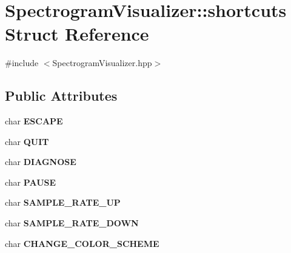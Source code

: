 \hypertarget{structSpectrogramVisualizer_1_1shortcuts}{}\section{Spectrogram\+Visualizer\+:\+:shortcuts Struct Reference}
\label{structSpectrogramVisualizer_1_1shortcuts}


{\ttfamily \#include $<$Spectrogram\+Visualizer.\+hpp$>$}

\subsection*{Public Attributes}
\begin{DoxyCompactItemize}
\item 
\mbox{\label{structSpectrogramVisualizer_1_1shortcuts_a3c916b79eb5fdbc9261962946104b26f}} 
char {\bfseries E\+S\+C\+A\+PE}
\item 
\mbox{\label{structSpectrogramVisualizer_1_1shortcuts_a2ce860bc091bea9e78da24cd5691c4b4}} 
char {\bfseries Q\+U\+IT}
\item 
\mbox{\label{structSpectrogramVisualizer_1_1shortcuts_a260568371342c5408ebb130ffa09cb33}} 
char {\bfseries D\+I\+A\+G\+N\+O\+SE}
\item 
\mbox{\label{structSpectrogramVisualizer_1_1shortcuts_a0c36f6e4ee64ad69c86e75fb0c986c00}} 
char {\bfseries P\+A\+U\+SE}
\item 
\mbox{\label{structSpectrogramVisualizer_1_1shortcuts_a19b5a234ecbb017c1dbcff99775f850a}} 
char {\bfseries S\+A\+M\+P\+L\+E\+\_\+\+R\+A\+T\+E\+\_\+\+UP}
\item 
\mbox{\label{structSpectrogramVisualizer_1_1shortcuts_addbcd297e9bd96d574b8d0f04c363c9c}} 
char {\bfseries S\+A\+M\+P\+L\+E\+\_\+\+R\+A\+T\+E\+\_\+\+D\+O\+WN}
\item 
\mbox{\label{structSpectrogramVisualizer_1_1shortcuts_ab233bdefbc2be60b645f8096c36a6966}} 
char {\bfseries C\+H\+A\+N\+G\+E\+\_\+\+C\+O\+L\+O\+R\+\_\+\+S\+C\+H\+E\+ME}
\end{DoxyCompactItemize}


